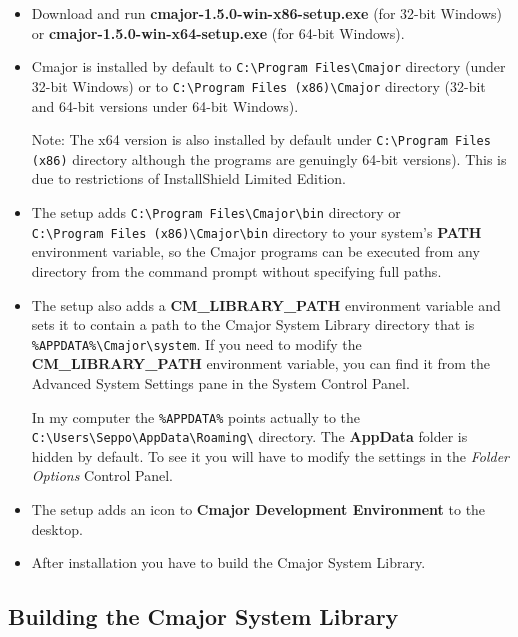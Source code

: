 \documentclass[oneside, a4paper, 11pt]{article}
\begin{document}
\begin{itemize}

\item
Download and run \textbf{cmajor-1.5.0-win-x86-setup.exe} (for 32-bit Windows) or
\textbf{cmajor-1.5.0-win-x64-setup.exe} (for 64-bit Windows).

\item
Cmajor is installed by default to \verb|C:\Program Files\Cmajor| directory (under 32-bit Windows) or
to \verb|C:\Program Files (x86)\Cmajor| directory (32-bit and 64-bit versions under 64-bit Windows).

Note: The x64 version is also installed by default under
\verb|C:\Program Files (x86)| directory although the programs are genuingly 64-bit versions).
This is due to restrictions of InstallShield Limited Edition.

\item
The setup adds \verb|C:\Program Files\Cmajor\bin| directory or \\
\verb|C:\Program Files (x86)\Cmajor\bin| directory
to your system's \textbf{PATH} environment variable, so the Cmajor programs can be executed from any
directory from the command prompt without specifying full paths.

\item
The setup also adds a \textbf{CM\_LIBRARY\_PATH} environment variable and
sets it to contain a path to the Cmajor System Library directory
that is \verb|%APPDATA%\Cmajor\system|. If you need to modify the
\textbf{CM\_LIBRARY\_PATH} environment variable, you can find it from the Advanced System Settings pane in the System Control Panel.

In my computer the \verb|%APPDATA%| points actually to the
\verb|C:\Users\Seppo\AppData\Roaming\| directory. The \textbf{AppData} folder
is hidden by default. To see it you will have to modify the settings in
the \emph{Folder Options} Control Panel.

\item
The setup adds an icon to \textbf{Cmajor Development Environment} to the desktop.

\item
After installation you have to build the Cmajor System Library.

\end{itemize}

\subsection{Building the Cmajor System Library}
\end{document}

